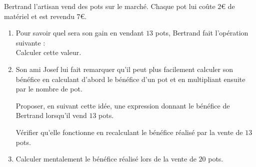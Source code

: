 
Bertrand l'artisan vend des pots sur le marché. Chaque pot lui coûte \( 2\)€ de matériel et est revendu \( 7\)€.
\begin{enumerate}
    \item
        Pour savoir quel sera son gain en vendant \( 13\) pots, Bertrand fait l'opération suivante :
        \begin{equation}
            
        \end{equation}
        Calculer cette valeur.
    \item
        Son ami Josef lui fait remarquer qu'il peut plus facilement calculer son bénéfice en calculant d'abord le bénéfice d'un pot et en multipliant ensuite par le nombre de pot.

        Proposer, en suivant cette idée, une expression donnant le bénéfice de Bertrand lorsqu'il vend \( 13\) pots.

        Vérifier qu'elle fonctionne en recalculant le bénéfice réalisé par la vente de \( 13\) pots.
    \item
        Calculer mentalement le bénéfice réalisé lors de la vente de \( 20\) pots.
\end{enumerate}

